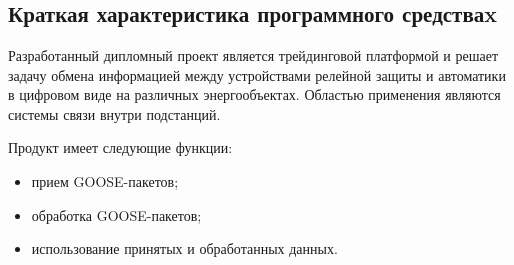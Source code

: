 \section{\texorpdfstring{\MakeUppercase \economicalPartName}{\economicalPartName}}


\subsection{Краткая характеристика программного средстваx}


Разработанный дипломный проект является трейдинговой платформой
и решает задачу обмена информацией между устройствами релейной защиты
и автоматики в цифровом виде на различных энергообъектах.
Областью применения являются системы связи внутри подстанций.

Продукт имеет следующие функции:
\begin{itemize}
  \item прием GOOSE-пакетов;
  \item обработка GOOSE-пакетов;
  \item использование принятых и обработанных данных.
\end{itemize}

